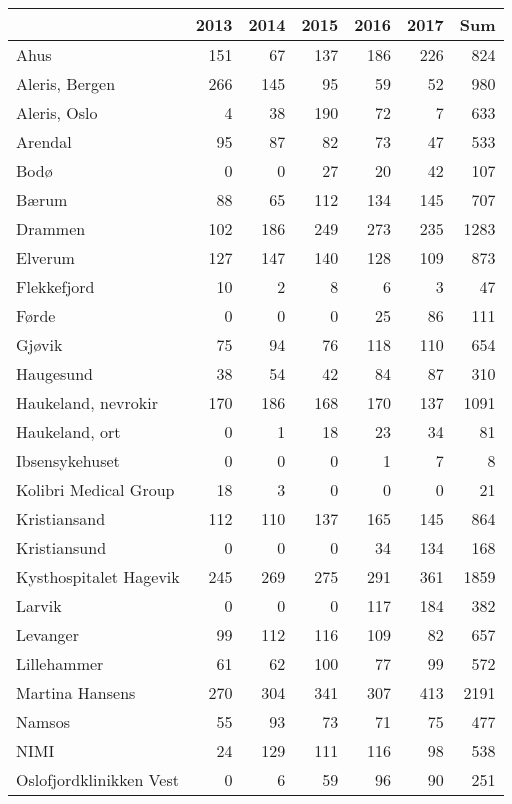 \begin{table}[ht]
\centering
\begin{tabular}{lrrrrrr}
  \hline
 & 2013 & 2014 & 2015 & 2016 & 2017 & Sum \\ 
  \hline
Ahus & 151 & 67 & 137 & 186 & 226 & 824 \\ 
  Aleris, Bergen & 266 & 145 & 95 & 59 & 52 & 980 \\ 
  Aleris, Oslo & 4 & 38 & 190 & 72 & 7 & 633 \\ 
  Arendal & 95 & 87 & 82 & 73 & 47 & 533 \\ 
  Bodø & 0 & 0 & 27 & 20 & 42 & 107 \\ 
  Bærum & 88 & 65 & 112 & 134 & 145 & 707 \\ 
  Drammen & 102 & 186 & 249 & 273 & 235 & 1283 \\ 
  Elverum & 127 & 147 & 140 & 128 & 109 & 873 \\ 
  Flekkefjord & 10 & 2 & 8 & 6 & 3 & 47 \\ 
  Førde & 0 & 0 & 0 & 25 & 86 & 111 \\ 
  Gjøvik & 75 & 94 & 76 & 118 & 110 & 654 \\ 
  Haugesund & 38 & 54 & 42 & 84 & 87 & 310 \\ 
  Haukeland, nevrokir & 170 & 186 & 168 & 170 & 137 & 1091 \\ 
  Haukeland, ort & 0 & 1 & 18 & 23 & 34 & 81 \\ 
  Ibsensykehuset & 0 & 0 & 0 & 1 & 7 & 8 \\ 
  Kolibri Medical Group & 18 & 3 & 0 & 0 & 0 & 21 \\ 
  Kristiansand & 112 & 110 & 137 & 165 & 145 & 864 \\ 
  Kristiansund & 0 & 0 & 0 & 34 & 134 & 168 \\ 
  Kysthospitalet Hagevik & 245 & 269 & 275 & 291 & 361 & 1859 \\ 
  Larvik & 0 & 0 & 0 & 117 & 184 & 382 \\ 
  Levanger & 99 & 112 & 116 & 109 & 82 & 657 \\ 
  Lillehammer & 61 & 62 & 100 & 77 & 99 & 572 \\ 
  Martina Hansens & 270 & 304 & 341 & 307 & 413 & 2191 \\ 
  Namsos & 55 & 93 & 73 & 71 & 75 & 477 \\ 
  NIMI & 24 & 129 & 111 & 116 & 98 & 538 \\ 
  Oslofjordklinikken Vest & 0 & 6 & 59 & 96 & 90 & 251 \\ 

\end{tabular}
\end{table}
